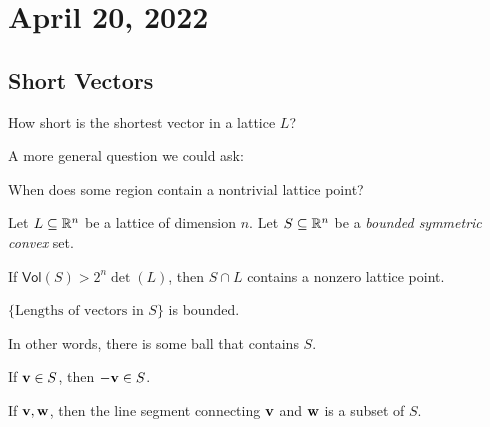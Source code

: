 \section{April 20, 2022}
\subsection{Short Vectors}
\begin{ques*}
    How short is the shortest vector in a lattice $L$?
\end{ques*}

A more general question we could ask:
\begin{ques*}
    When does some region contain a nontrivial lattice point?
\end{ques*}

\begin{theorem}
    Let $L\subseteq \mathbb R^n$ be a lattice of dimension $n$. Let $S\subseteq\mathbb R^n$ be a \emph{bounded symmetric convex} set.

    If $\mathsf{Vol}(S)>2^n\det(L)$, then $S\cap L$ contains a nonzero lattice point.
\end{theorem}

\begin{definition}
    $\{\text{Lengths of vectors in }S\}$ is bounded.

    In other words, there is some ball that contains $S$.
\end{definition}

\begin{definition}
    If $\mathbf{v}\in S$, then $-\mathbf{v}\in S$.
\end{definition}

\begin{definition}
    If $\mathbf{v}, \mathbf{w}$, then the line segment connecting $\mathbf{v}$ and $\mathbf{w}$ is a subset of $S$.
\end{definition}

